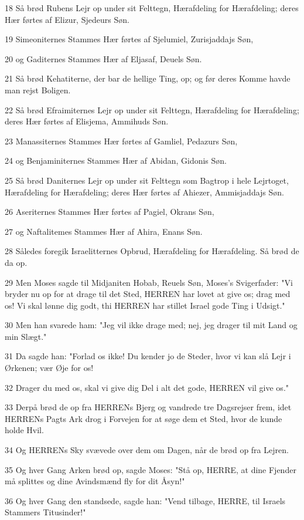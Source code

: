 \par 18 Så brød Rubens Lejr op under sit Felttegn, Hærafdeling for Hærafdeling; deres Hær førtes af Elizur, Sjedeurs Søn.
\par 19 Simeoniternes Stammes Hær førtes af Sjelumiel, Zurisjaddajs Søn,
\par 20 og Gaditernes Stammes Hær af Eljasaf, Deuels Søn.
\par 21 Så brød Kehatiterne, der bar de hellige Ting, op; og før deres Komme havde man rejst Boligen.
\par 22 Så brød Efraimiternes Lejr op under sit Felttegn, Hærafdeling for Hærafdeling; deres Hær førtes af Elisjema, Ammihuds Søn.
\par 23 Manassiternes Stammes Hær førtes af Gamliel, Pedazurs Søn,
\par 24 og Benjaminiternes Stammes Hær af Abidan, Gidonis Søn.
\par 25 Så brød Daniternes Lejr op under sit Felttegn som Bagtrop i hele Lejrtoget, Hærafdeling for Hærafdeling; deres Hær førtes af Ahiezer, Ammisjaddajs Søn.
\par 26 Aseriternes Stammes Hær førtes af Pagiel, Okrans Søn,
\par 27 og Naftalitemes Stammes Hær af Ahira, Enans Søn.
\par 28 Således foregik Israelitternes Opbrud, Hærafdeling for Hærafdeling. Så brød de da op.
\par 29 Men Moses sagde til Midjaniten Hobab, Reuels Søn, Moses's Svigerfader: "Vi bryder nu op for at drage til det Sted, HERREN har lovet at give os; drag med os! Vi skal lønne dig godt, thi HERREN har stillet Israel gode Ting i Udsigt."
\par 30 Men han svarede ham: "Jeg vil ikke drage med; nej, jeg drager til mit Land og min Slægt."
\par 31 Da sagde han: "Forlad os ikke! Du kender jo de Steder, hvor vi kan slå Lejr i Ørkenen; vær Øje for os!
\par 32 Drager du med os, skal vi give dig Del i alt det gode, HERREN vil give os."
\par 33 Derpå brød de op fra HERRENs Bjerg og vandrede tre Dagsrejser frem, idet HERRENs Pagts Ark drog i Forvejen for at søge dem et Sted, hvor de kunde holde Hvil.
\par 34 Og HERRENs Sky svævede over dem om Dagen, når de brød op fra Lejren.
\par 35 Og hver Gang Arken brød op, sagde Moses: "Stå op, HERRE, at dine Fjender må splittes og dine Avindsmænd fly for dit Åsyn!"
\par 36 Og hver Gang den standsede, sagde han: "Vend tilbage, HERRE, til Israels Stammers Titusinder!"

